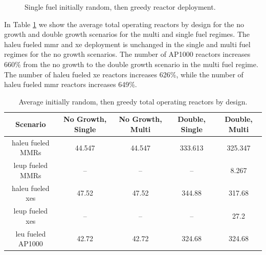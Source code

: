 \begin{figure}[H]
    \hfill
    \caption{Single fuel initially random, then greedy reactor deployment.}
    \label{fig:rand_greed_of_reactors}
\end{figure}

In Table \ref{tab:rand_greed_reac_avg} we show the average total operating
reactors by design for the no growth and double growth scenarios for the multi
and single fuel regimes. The \gls{haleu} fueled \gls{mmr} and \gls{xe}
deployment is unchanged in the single and multi fuel regimes for the no growth
scenarios. The number of AP1000 reactors increases 660\% from the no growth to
the double growth scenario in the multi fuel regime. The number of \gls{haleu}
fueled \gls{xe} reactors increases 626\%, while the number of \gls{haleu}
fueled \gls{mmr} reactors increases 649\%.

\begin{table}[H]
    \centering
    \caption{Average initially random, then greedy total operating reactors by design.}
    \label{tab:rand_greed_reac_avg}
    \begin{tabular}{c c c c c}
       \hline
       Scenario & No Growth, Single & No Growth, Multi & Double, Single & Double, Multi  \\
       \hline
       \gls{haleu} fueled MMRs      & 44.547  & 44.547  & 333.613 & 325.347 \\
       \gls{leup} fueled MMRs       & --      & --      & --      & 8.267   \\
       \gls{haleu} fueled \gls{xe}s & 47.52   & 47.52   & 344.88  & 317.68  \\
       \gls{leup} fueled \gls{xe}s  & --      & --      & --      & 27.2    \\
       \gls{leu} fueled AP1000      & 42.72   & 42.72   & 324.68  & 324.68  \\
       \hline
    \end{tabular}
\end{table}

